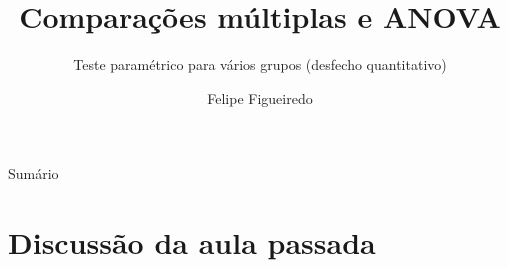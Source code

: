 \documentclass{beamer}
\title%
{Comparações múltiplas e ANOVA}
\subtitle
{\small Teste paramétrico para vários grupos (desfecho quantitativo)} %
\author%
{Felipe Figueiredo}%
\institute[INTO] %
{Instituto Nacional de Traumatologia e Ortopedia
}
\date%
{}
\begin{document}
\begin{frame}
  \titlepage
\end{frame}

\begin{frame}{Sumário}
  \tableofcontents
\end{frame}








\section{Discussão da aula passada}
\end{document}
